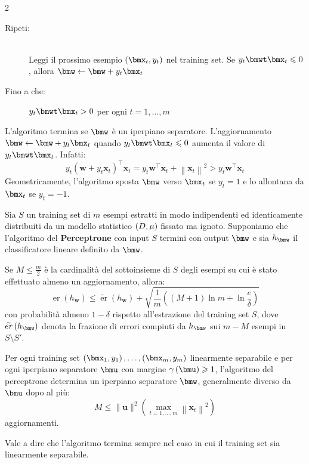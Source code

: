 \documentclass[\main/main.tex]{subfiles}
\begin{document}
\begin{multicols}{2}
\begin{definition}[Perceptrone]
\begin{description}
        \item[Ripeti:]\~\\
            Leggi il prossimo esempio \(\rnd{\bmx_t, y_t}\) nel training set.
            Se \(y_t\bmwt\bmx_t\leq 0\), allora \(\bmw \leftarrow \bmw + y_t\bmx_t\)
        \item[Fino a che:] \(y_t\bmwt\bmx_t > 0\) per ogni \(t=1,\ldots,m\)
    \end{description}
    L'algoritmo termina se \(\bmw\) è un iperpiano separatore. L'aggiornamento \(\bmw \leftarrow \bmw + y_t\bmx_t\) quando \(y_t\bmwt\bmx_t \leq 0\) aumenta il valore di \(y_t\bmwt\bmx_t\). Infatti:
    \[y_{t}\left(\boldsymbol{w}+y_{t} \boldsymbol{x}_{t}\right)^{\top} \boldsymbol{x}_{t}=y_{t} \boldsymbol{w}^{\top} \boldsymbol{x}_{t}+\left\|\boldsymbol{x}_{t}\right\|^{2}>y_{t} \boldsymbol{w}^{\top} \boldsymbol{x}_{t}\]
    Geometricamente, l'algoritmo sposta \(\bmw\) verso \(\bmx_t\) se \(y_t = 1\) e lo allontana da \(\bmx_t\) se \(y_t = -1\).
\end{definition}
\begin{corollary}
    Sia \(S\) un training set di \(m\) esempi estratti in modo indipendenti ed identicamente distribuiti da un modello statistico \(\left(D,\mu\right)\) fissato ma ignoto. Supponiamo che l'algoritmo del \textbf{Perceptrone} con input \(S\) termini con output \(\bmw\) e sia \(h_{\bmw}\) il classificatore lineare definito da \(\bmw\).
    
    Se \(M \leq \frac{m}{2}\) è la cardinalità del sottoinsieme di \(S\) degli esempi su cui è stato effettuato almeno un aggiornamento, allora:
    \[
        \operatorname{er}\left(h_{\boldsymbol{w}}\right) \leq \widetilde{\operatorname{er}}\left(h_{\boldsymbol{w}}\right)+\sqrt{\frac{1}{m}\left((M+1) \ln m+\ln \frac{e}{\delta}\right)}
    \]
    con probabilità almeno \(1-\delta\) rispetto all'estrazione del training set \(S\), dove \(\tilde{er}\rnd{h_{\bmw}}\) denota la frazione di errori compiuti da \(h_{\bmw}\) sui \(m-M\) esempi in \(S\setminus S'\).
\end{corollary}
\end{multicols}
\begin{theorem}
    Per ogni training set \(\examples{m}\) linearmente separabile e per ogni iperpiano separatore \(\bmu\) con margine \(\gamma\rnd{\bmu} \geq 1\), l'algoritmo del perceptrone determina un iperpiano separatore \(\bmw\), generalmente diverso da \(\bmu\) dopo al più:
    \[M \leq\|\boldsymbol{u}\|^{2}\left(\max _{t=1, \ldots, m}\left\|\boldsymbol{x}_{t}\right\|^{2}\right)\]
    aggiornamenti.
    
    Vale a dire che l'algoritmo termina sempre nel caso in cui il training set sia linearmente separabile.
\end{theorem}
\end{document}
